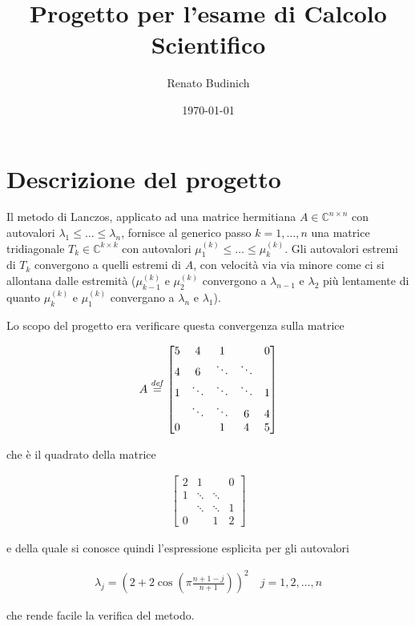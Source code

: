 \documentclass[11pt]{article}
\author{Renato Budinich}
\date{\today}
\title{Progetto per l'esame di Calcolo Scientifico}
\numberwithin{equation}{subsection}
\newcommand{\defi}{\ensuremath{\stackrel{\mbox{\scriptsize{\textit{def}}}}{=}}}
\begin{document}
\maketitle
\section{Descrizione del progetto}
\label{sec-1}
Il metodo di Lanczos, applicato ad una matrice hermitiana $A \in \mathbb{C}^{n\times n}$ con autovalori $\lambda_1\leq \ldots \leq \lambda_n$, fornisce al generico passo $k=1, \ldots, n$ una matrice tridiagonale $T_k \in \mathbb{C}^{k \times k}$ con autovalori $\mu_1^{(k)} \leq \ldots \leq \mu_k^{(k)}$. Gli autovalori estremi di $T_k$ convergono a quelli estremi di $A$, con velocità via via minore come ci si allontana dalle estremità ($\mu_{k-1}^{(k)}$ e $\mu_2^{(k)}$ convergono a $\lambda_{n-1}$ e $\lambda_2$ più lentamente di quanto $\mu_k^{(k)}$ e $\mu_1^{(k)}$ convergano a $\lambda_n$ e $\lambda_1$).

Lo scopo del progetto era verificare questa convergenza sulla matrice 

\begin{align*}
A \defi
\begin{bmatrix}
5 & 4 & 1 & & 0\\
4 & 6 & \ddots & \ddots & \\
1 & \ddots & \ddots & \ddots & 1\\
& \ddots & \ddots & 6 & 4  \\
0 & & 1 & 4 & 5
\end{bmatrix}
\end{align*}

che è il quadrato della matrice

\begin{align*}
\begin{bmatrix}
2 & 1 & & 0\\
1 & \ddots & \ddots & \\
& \ddots & \ddots & 1 \\
0 & & 1 & 2
\end{bmatrix}
\end{align*}

e della quale si conosce quindi l'espressione esplicita per gli autovalori

\begin{align}
\label{lambda}
\lambda_j = (2 + 2 \cos(\pi \frac{n+1-j}{n+1}))^2 \quad j=1,2, \ldots, n
\end{align}

che rende facile la verifica del metodo.
\end{document}
